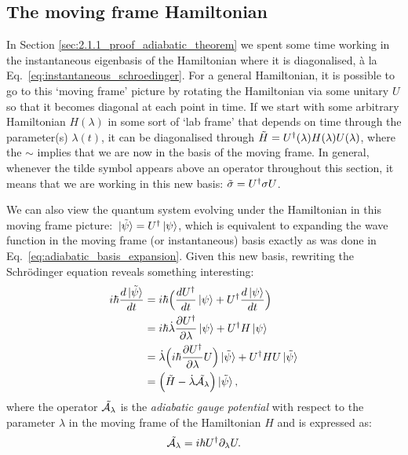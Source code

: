    \subsection{The moving frame Hamiltonian}

    In Section \ref{sec:2.1.1_proof_adiabatic_theorem} we spent some time working in the instantaneous eigenbasis of the Hamiltonian where it is diagonalised, à la Eq.~\eqref{eq:instantaneous_schroedinger}. For a general Hamiltonian, it is possible to go to this `moving frame' picture by rotating the Hamiltonian via some unitary $U$ so that it becomes diagonal at each point in time. If we start with some arbitrary Hamiltonian $H(\lambda)$ in some sort of `lab frame' that depends on time through the parameter(s) $\lambda(t)$, it can be diagonalised through $\Tilde{H} = U^{\dagger}(\lambda)H(\lambda)U(\lambda)$, where the $\sim$ implies that we are now in the basis of the moving frame. In general, whenever the tilde symbol appears above an operator throughout this section, it means that we are working in this new basis: $\Tilde{\sigma} = U^{\dagger}\sigma U$.

    We can also view the quantum system evolving under the Hamiltonian in this moving frame picture: $\ket*{\Tilde{\psi}} = U^{\dagger}\ket{\psi}$, which is equivalent to expanding the wave function in the moving frame (or instantaneous) basis exactly as was done in Eq.~\eqref{eq:adiabatic_basis_expansion}. Given this new basis, rewriting the Schr\"{o}dinger equation reveals something interesting:
    \begin{equation}\label{eq:moving_frame_schrodinger}
        \begin{aligned}
            i \hbar \frac{d \ket*{\Tilde{\psi}}}{dt} &= i \hbar \Big( \frac{d U^{\dagger}}{dt}\ket*{\psi} + U^{\dagger} \frac{d \ket{\psi}}{dt} \Big) \\
            &= i \hbar \dot{\lambda} \frac{\partial U^{\dagger}}{\partial \lambda}\ket{\psi} + U^{\dagger} H\ket{\psi}\\
            &= \dot{\lambda} \Big(i\hbar \frac{\partial U^{\dagger}}{\partial \lambda}U \Big)\ket*{\Tilde{\psi}} + U^{\dagger} H U \ket*{\Tilde{\psi}} \\
            &= \Big(\Tilde{H} - \dot{\lambda}\Tilde{\mathcal{A}_{\lambda}}\Big) \ket*{\Tilde{\psi}},
        \end{aligned}
    \end{equation}
    where the operator $\Tilde{\mathcal{A}_{\lambda}}$ is the \emph{adiabatic gauge potential} with respect to the parameter $\lambda$ in the moving frame of the Hamiltonian $H$ and is expressed as:
    \begin{equation}\label{eq:AGP_in_terms_of_U}
        \Tilde{\mathcal{A}_{\lambda}} = i\hbar U^{\dagger}\partial_{\lambda} U.
    \end{equation}
    
